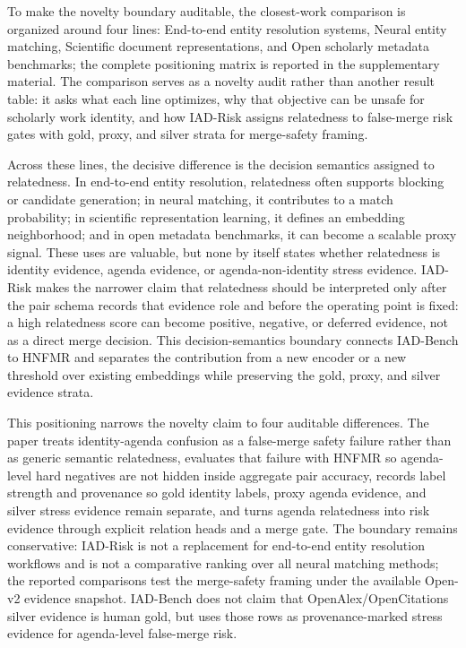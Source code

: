 \documentclass[preprint,12pt]{elsarticle}
\begin{document}
To make the novelty boundary auditable, the closest-work comparison is organized around four lines: End-to-end entity resolution systems, Neural entity matching, Scientific document representations, and Open scholarly metadata benchmarks; the complete positioning matrix is reported in the supplementary material. The comparison serves as a novelty audit rather than another result table: it asks what each line optimizes, why that objective can be unsafe for scholarly work identity, and how IAD-Risk assigns relatedness to false-merge risk gates with gold, proxy, and silver strata for merge-safety framing.

Across these lines, the decisive difference is the decision semantics assigned to relatedness. In end-to-end entity resolution, relatedness often supports blocking or candidate generation; in neural matching, it contributes to a match probability; in scientific representation learning, it defines an embedding neighborhood; and in open metadata benchmarks, it can become a scalable proxy signal. These uses are valuable, but none by itself states whether relatedness is identity evidence, agenda evidence, or agenda-non-identity stress evidence. IAD-Risk makes the narrower claim that relatedness should be interpreted only after the pair schema records that evidence role and before the operating point is fixed: a high relatedness score can become positive, negative, or deferred evidence, not as a direct merge decision. This decision-semantics boundary connects IAD-Bench to HNFMR and separates the contribution from a new encoder or a new threshold over existing embeddings while preserving the gold, proxy, and silver evidence strata.

This positioning narrows the novelty claim to four auditable differences. The paper treats identity-agenda confusion as a false-merge safety failure rather than as generic semantic relatedness, evaluates that failure with HNFMR so agenda-level hard negatives are not hidden inside aggregate pair accuracy, records label strength and provenance so gold identity labels, proxy agenda evidence, and silver stress evidence remain separate, and turns agenda relatedness into risk evidence through explicit relation heads and a merge gate. The boundary remains conservative: IAD-Risk is not a replacement for end-to-end entity resolution workflows and is not a comparative ranking over all neural matching methods; the reported comparisons test the merge-safety framing under the available Open-v2 evidence snapshot. IAD-Bench does not claim that OpenAlex/OpenCitations silver evidence is human gold, but uses those rows as provenance-marked stress evidence for agenda-level false-merge risk.
\end{document}
